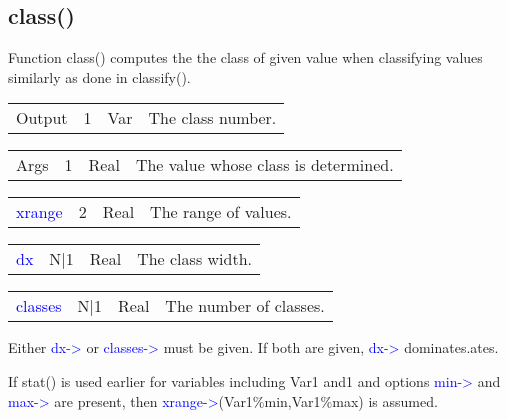 \subsection{class()}
\label{class}
Function \textcolor{VioletRed}{class}() computes the the class of given value when classifying values
similarly as done in \textcolor{VioletRed}{classify}().
\begin{table}[H]
\begin{tabular}{ m{}  m{}m{}p{}}
Output&1&Var&The class number.
\\ \cline{1-4}
\end{tabular}
\end{table}
\vspace{-1.51em}
\begin{table}[H]
\begin{tabular}{ m{}  m{}m{}p{}}
Args&1&Real&The value whose class is determined.
\\ \cline{1-4}
\end{tabular}
\end{table}
\vspace{-1.51em}
\begin{table}[H]
\begin{tabular}{ m{}  m{}m{}p{}}
\textcolor{blue}{xrange}&2&Real&The range of values.
\\ \cline{1-4}
\end{tabular}
\end{table}
\vspace{-1.51em}
\begin{table}[H]
\begin{tabular}{ m{}  m{}m{}p{}}
\textcolor{blue}{dx}&N|1&Real&The class width.
\\ \cline{1-4}
\end{tabular}
\end{table}
\vspace{-1.51em}
\begin{table}[H]
\begin{tabular}{ m{}  m{}m{}p{}}
\textcolor{blue}{classes}&N|1&Real&The number of classes.
\\ \cline{1-4}
\end{tabular}
\end{table}
\begin{note}
Either \textcolor{blue}{dx->} or \textcolor{blue}{classes->} must be given. If both are given, \textcolor{blue}{dx->} dominates.ates.
\end{note}
\begin{note}
If \textcolor{VioletRed}{stat}() is used earlier for variables including Var1 and1 and
 options \textcolor{blue}{min->} and \textcolor{blue}{max->} are present, then
\textcolor{blue}{xrange->}(Var1\%min,Var1\%max) is assumed.
\end{note}
